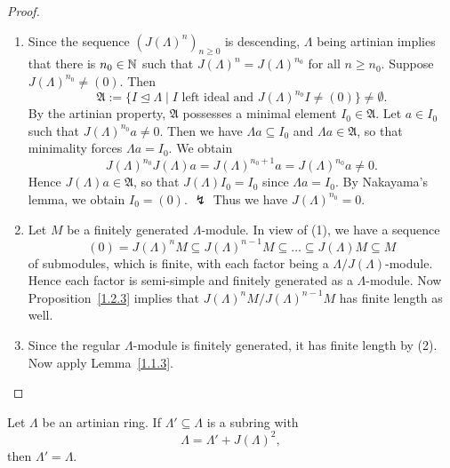 
\begin{proof}\
\begin{enumerate}
\item Since the sequence $(J(\Lambda)^n)_{n\ge 0}$ is descending, $\Lambda$ being artinian implies that there is $n_0\in\mathbb{N}$ such that $J(\Lambda)^n=J(\Lambda)^{n_0}$ for all $n\ge n_0$. Suppose $J(\Lambda)^{n_0}\neq (0)$. Then
\[
\mathfrak A :=\{I\trianglelefteq \Lambda \mid I\text{ left ideal and } J(\Lambda)^{n_0}I\neq (0) \}\neq\emptyset.
\]
By the artinian property, $\mathfrak A$ possesses a minimal element $I_0\in\mathfrak A$. Let $a\in I_0$ such that $J(\Lambda)^{n_0}a\ne 0$. Then we have $\Lambda a\subseteq I_0$ and $\Lambda a\in \mathfrak A$, so that minimality forces $\Lambda a=I_0$. We obtain
\[
J(\Lambda)^{n_0} J(\Lambda) a = J(\Lambda)^{n_0+1}a = J(\Lambda)^{n_0} a \neq 0.
\]
Hence $J(\Lambda) a\in\mathfrak A$, so that $J(\Lambda) I_0 = I_0$ since $\Lambda a=I_0$. By Nakayama's lemma, we obtain $I_0=(0)$. $\lightning$ Thus we have $J(\Lambda)^{n_0}=0$.

\item Let $M$ be a finitely generated $\Lambda$-module. In view of (1), we have a sequence
\[
(0) = J(\Lambda)^{n} M \subseteq J(\Lambda)^{n-1} M \subseteq \dots \subseteq J(\Lambda) M \subseteq M
\]
of submodules, which is finite, with each factor being a $\Lambda/J(\Lambda)$-module. Hence each factor is semi-simple and finitely generated as a $\Lambda$-module. Now Proposition~\ref{1.2.3} implies that $J(\Lambda)^{n} M / J(\Lambda)^{n-1} M$ has finite length as well.

\item Since the regular $\Lambda$-module is finitely generated, it has finite length by (2). Now apply Lemma~\ref{1.1.3}.\qedhere
\end{enumerate}
\end{proof}


\begin{proposition}
Let $\Lambda$ be an artinian ring. If $\Lambda'\subseteq \Lambda$ is a subring with
\[
\Lambda=\Lambda'+J(\Lambda)^2,
\]
then $\Lambda'=\Lambda$.
\end{proposition}


